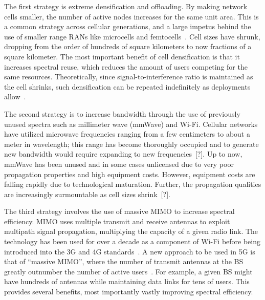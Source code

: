 \documentclass[12pt,dvipsnames]{report}
\begin{document}
The first strategy is extreme densification and offloading.  By making network cells smaller, the number of active nodes increases for the same unit area.  This is a common strategy across cellular generations, and a large impetus behind the use of smaller range RANs like microcells and femtocells~\cite{4623708}.  Cell sizes have shrunk, dropping from the order of hundreds of square kilometers to now fractions of a square kilometer.  The most important benefit of cell densification is that it increases spectral reuse, which reduces the amount of users competing for the same resources.  Theoretically, since signal-to-interference ratio is maintained as the cell shrinks, such densification can be repeated indefinitely as deployments allow~\cite{6824752, 6171996}.

The second strategy is to increase bandwidth through the use of previously unused spectra such as millimeter wave (mmWave) and Wi-Fi.  Cellular networks have utilized microwave frequencies ranging from a few centimeters to about a meter in wavelength; this range has become thoroughly occupied and to generate new bandwidth would require expanding to new frequencies~[?].  Up to now, mmWave has been unused and in some cases unlicensed due to very poor propagation properties and high equipment costs.  However, equipment costs are falling rapidly due to technological maturation.  Further, the propagation qualities are increasingly surmountable as cell sizes shrink~[?].


The third strategy involves the use of massive MIMO to increase spectral efficiency.  MIMO uses multiple transmit and receive antennas to exploit multipath signal propagation, multiplying the capacity of a given radio link.  The technology has been used for over a decade as a component of Wi-Fi before being introduced into the 3G and 4G standards~\cite{6824752}.  A new approach to be used in 5G is that of ``massive MIMO'', where the number of transmit antennas at the BS greatly outnumber the number of active users~\cite{5595728}.  For example, a given BS might have hundreds of antennas while maintaining data links for tens of users.  This provides several benefits, most importantly vastly improving spectral efficiency.
\end{document}
